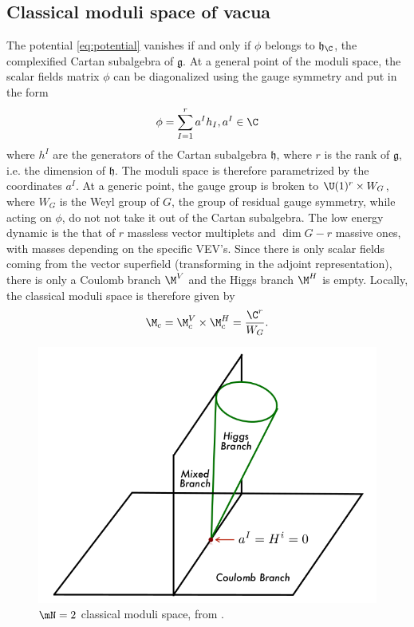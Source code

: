 \documentclass{worksheetclass}
\begin{document}
    \subsection{Classical moduli space of vacua}

        The potential \eqref{eq:potential} vanishes if and only if $\phi$ belongs to $\mathfrak{h}_\C$, the complexified Cartan subalgebra of $\mathfrak{g}$. At a general point of the moduli space, the scalar fields matrix $\phi$ can be diagonalized using the gauge symmetry and put in the form
        \begin{equation}
            \phi=\sum^r_{I=1}a^Ih_I, a^I\in\C
        \end{equation}
        where $h^I$ are the generators of the Cartan subalgebra $\mathfrak{h}$, where $r$ is the rank of $\mathfrak{g}$, i.e. the dimension of $\mathfrak{h}$. The moduli space is therefore parametrized by the coordinates $a^I$. At a generic point, the gauge group is broken to $\U(1)^r\times W_G$, where $W_G$ is the Weyl group of $G$, the group of residual gauge symmetry, while acting on $\phi$, do not not take it out of the Cartan subalgebra. The low energy dynamic is the that of $r$ massless vector multiplets and $\dim G-r$ massive ones, with masses depending on the specific VEV's. Since there is only scalar fields coming from the vector superfield (transforming in the adjoint representation), there is only a Coulomb branch $\M^V$ and the Higgs branch $\M^H$ is empty. Locally, the classical moduli space is therefore given by
        \begin{eqnarray}
            \M_c = \M^V_{c}\times\M^H_{c}=\frac{\C^r}{W_G}.\label{eq:classicalmodulispaceproduct}
        \end{eqnarray}

        \begin{figure}[H]
            \centering
            \includegraphics[scale=0.35]{Pictures/classicalmodulispace.png}
            \caption{$\mN=2$ classical moduli space, from \cite{bertolinisusy}.}
        \end{figure}
\end{document}
